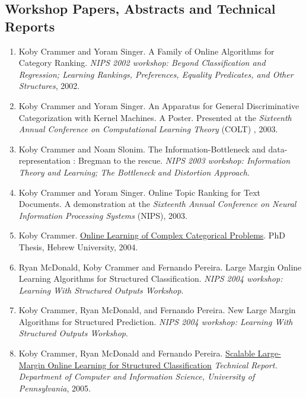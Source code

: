 \documentclass{resume}
\newcommand{\nolineskips}{
\setlength{\parskip}{1pt}
\setlength{\parsep}{1pt}
\setlength{\topsep}{1pt}
\setlength{\partopsep}{1pt}
\setlength{\itemsep}{1pt}}
\begin{document}
\subsection*{Workshop Papers, Abstracts and Technical Reports}
\begin{enumerate}
\nolineskips
\item {Koby Crammer} and Yoram Singer.
A Family of Online Algorithms for Category Ranking.
{\em NIPS 2002 workshop: Beyond Classification and Regression; Learning Rankings,
    Preferences, Equality Predicates, and Other Structures}, 2002.

\item {Koby Crammer} and Yoram Singer.
An Apparatus for General Discriminative Categorization with Kernel Machines.
A Poster. Presented at the {\em Sixteenth Annual Conference on Computational Learning Theory} (COLT) , 2003.

\item {Koby Crammer} and Noam Slonim.
The Information-Bottleneck and data-representation : Bregman to the rescue.
{\em NIPS 2003 workshop: Information Theory and Learning; The Bottleneck and Distortion Approach}.

\item {Koby Crammer} and Yoram Singer.
Online Topic Ranking for Text Documents.
A demonstration at the
{\em Sixteenth Annual Conference on Neural Information Processing Systems} (NIPS), 2003.

\item {Koby Crammer}.
\href{http://www.cis.upenn.edu/~crammer/publications/thesis.pdf}
{Online Learning of Complex Categorical Problems}.
PhD Thesis, Hebrew University, 2004.

\item Ryan McDonald, {Koby Crammer} and Fernando Pereira.
Large Margin Online Learning Algorithms for Structured Classification.
{\em NIPS 2004 workshop: Learning With Structured Outputs Workshop}.

\item {Koby Crammer}, Ryan McDonald, and Fernando Pereira.
New Large Margin Algorithms for Structured Prediction.
{\em NIPS 2004 workshop: Learning With Structured Outputs Workshop}.

\item {Koby Crammer}, Ryan McDonald  and Fernando Pereira.
\href{http://www.cis.upenn.edu/~crammer/publications/scalable.pdf}{Scalable Large-Margin Online Learning for Structured Classification}
{\em Technical Report. Department of Computer and Information Science, University of Pennsylvania}, 2005.


\end{enumerate}
\end{document}
